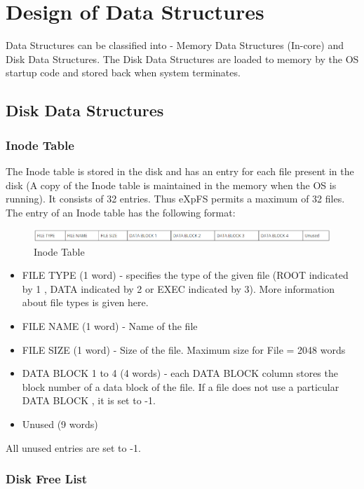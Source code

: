 \chapter{Design of Data Structures}
\label{chap8}

Data Structures can be classified into - Memory Data Structures (In-core) and Disk Data Structures. The Disk Data Structures are loaded to memory by the OS startup code and stored back when system terminates.
\section{Disk Data Structures}

\subsection{Inode Table}

The Inode table is stored in the disk and has an entry for each file present in the disk (A copy of the Inode table is maintained in the memory when the OS is running). It consists of 32 entries. Thus eXpFS permits a maximum of 32 files.
\\
The entry of an Inode table has the following format:

\begin{figure}[ht]
\centering
\includegraphics [scale=0.55]{figures/INODE.png}
\caption{\footnotesize Inode Table}
\end{figure}

\begin{itemize}
\item FILE TYPE (1 word) - specifies the type of the given file (ROOT indicated by 1 , DATA indicated by 2 or EXEC indicated by 3). More information about file types is given here.
\item FILE NAME (1 word) - Name of the file
\item FILE SIZE (1 word) - Size of the file. Maximum size for File = 2048 words
\item DATA BLOCK 1 to 4 (4 words) - each DATA BLOCK column stores the block number of a data block of the file. If a file does not use a particular DATA BLOCK , it is set to -1.
\item Unused (9 words)
\end{itemize}
All unused entries are set to -1.


\subsection{Disk Free List}


